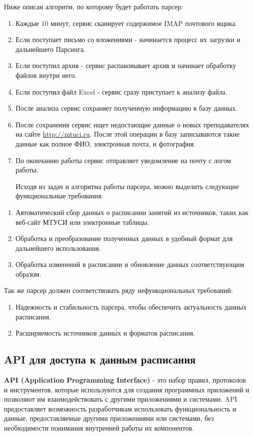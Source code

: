 Ниже описан алгоритм, по которому будет работать парсер:
\begin{enumerate}
  \item Каждые 10 минут, сервис сканирует содержимое IMAP почтового ящика.
  \item Если поступает письмо со вложениями - начинается процесс их загрузки и дальнейшего Парсинга.
  \item Если поступил архив - сервис распаковывает архив и начинает обработку файлов внутри него.
  \item Если поступил файл Excel - сервис сразу приступает к анализу файла.
  \item После анализа сервис сохраняет полученную информацию в базу данных.
  \item После сохранения сервис ищет недостающие данные о новых преподавателях на сайте
  \url{http://mtuci.ru}. После этой операции в базу записываются такие данные как полное ФИО,
  электронная почта, и фотография.
  \item По окончанию работы сервис отправляет уведомление на почту с логом работы.

  Исходя из задач и алгоритма работы парсера, можно выделить следующие функциональные требования:
\end{enumerate}
\begin{enumerate}
  \item Автоматический сбор данных о расписании занятий из источников, таких как веб-сайт МТУСИ или электронные таблицы.
  \item Обработка и преобразование полученных данных в удобный формат для дальнейшего использования.
  \item Обработка изменений в расписании и обновление данных соответствующим образом.
\end{enumerate}

Так же парсер должен соответствовать ряду нефункциональных требований:
\begin{enumerate}
  \item Надежность и стабильность парсера, чтобы обеспечить актуальность данных расписания.
  \item Расширяемость источников данных и форматов расписания.
\end{enumerate}

\subsection{API для доступа к данным расписания}
\textbf{API (Application Programming Interface)} - это набор правил, протоколов и инструментов,
которые используются для создания программных приложений и позволяют им взаимодействовать с другими приложениями и системами.
API предоставляет возможность разработчикам использовать функциональность и данные,
предоставляемые другими приложениями или системами,
без необходимости понимания внутренней работы их компонентов.

